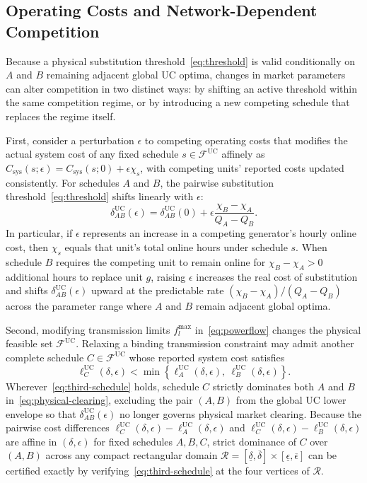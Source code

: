 \documentclass[journal]{IEEEtran}
\newcommand{\UC}{\mathrm{UC}}
\begin{document}
\subsection{Operating Costs and Network-Dependent Competition}

Because a physical substitution threshold~\eqref{eq:threshold} is valid conditionally on $A$ and $B$ remaining adjacent global UC optima, changes in market parameters can alter competition in two distinct ways: by shifting an active threshold within the same competition regime, or by introducing a new competing schedule that replaces the regime itself.

First, consider a perturbation $\epsilon$ to competing operating costs that modifies the actual system cost of any fixed schedule $s\in\mathcal{F}^{\UC}$ affinely as $C_{\mathrm{sys}}(s;\epsilon)=C_{\mathrm{sys}}(s;0)+\epsilon\chi_s$, with competing units' reported costs updated consistently. For schedules $A$ and $B$, the pairwise substitution threshold~\eqref{eq:threshold} shifts linearly with $\epsilon$:
\begin{equation}
\delta_{AB}^{\UC}(\epsilon)
= \delta_{AB}^{\UC}(0) + \epsilon\frac{\chi_B - \chi_A}{Q_A - Q_B}.\label{eq:threshold-shift}
\end{equation}
In particular, if $\epsilon$ represents an increase in a competing generator's hourly online cost, then $\chi_s$ equals that unit's total online hours under schedule $s$. When schedule $B$ requires the competing unit to remain online for $\chi_B-\chi_A>0$ additional hours to replace unit $g$, raising $\epsilon$ increases the real cost of substitution and shifts $\delta_{AB}^{\UC}(\epsilon)$ upward at the predictable rate $(\chi_B-\chi_A)/(Q_A-Q_B)$ across the parameter range where $A$ and $B$ remain adjacent global optima.

Second, modifying transmission limits $f_l^{\max}$ in~\eqref{eq:powerflow} changes the physical feasible set $\mathcal{F}^{\UC}$. Relaxing a binding transmission constraint may admit another complete schedule $C\in\mathcal{F}^{\UC}$ whose reported system cost satisfies
\begin{equation}
\ell_C^{\UC}(\delta,\epsilon)
< \min\left\{ \ell_A^{\UC}(\delta,\epsilon),\ \ell_B^{\UC}(\delta,\epsilon) \right\}.\label{eq:third-schedule}
\end{equation}
Wherever~\eqref{eq:third-schedule} holds, schedule $C$ strictly dominates both $A$ and $B$ in~\eqref{eq:physical-clearing}, excluding the pair $(A,B)$ from the global UC lower envelope so that $\delta_{AB}^{\UC}(\epsilon)$ no longer governs physical market clearing. Because the pairwise cost differences $\ell_C^{\UC}(\delta,\epsilon)-\ell_A^{\UC}(\delta,\epsilon)$ and $\ell_C^{\UC}(\delta,\epsilon)-\ell_B^{\UC}(\delta,\epsilon)$ are affine in $(\delta,\epsilon)$ for fixed schedules $A,B,C$, strict dominance of $C$ over $(A,B)$ across any compact rectangular domain $\mathcal{R}=[\underline{\delta},\overline{\delta}]\times[\underline{\epsilon},\overline{\epsilon}]$ can be certified exactly by verifying~\eqref{eq:third-schedule} at the four vertices of $\mathcal{R}$.
\end{document}
